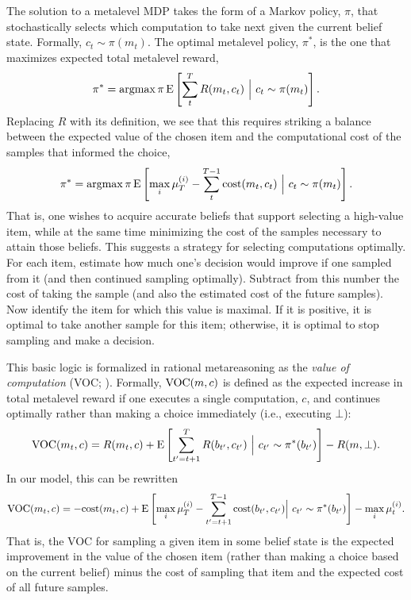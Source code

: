 The solution to a metalevel MDP takes the form of a Markov policy, $\pi$, that stochastically selects which computation to take next given the current belief state. Formally, $c_t \sim \pi(m_t)$. The optimal metalevel policy, $\pi^*$, is the one that maximizes expected total metalevel reward,
\begin{equation*}
  \pi^* = \operatorname*{argmax}{\pi} \operatorname*{E} \left[ \sum_t^T R(m_t, c_t) \ \Big\vert\ c_t \sim \pi(m_t) \right].
\end{equation*}
Replacing $R$ with its definition, we see that this requires striking a balance between the expected value of the chosen item and the computational cost of the samples that informed the choice,
\begin{equation*}
  \pi^* = \operatorname*{argmax}{\pi} \operatorname*{E} \left[
     \max_i \mu_T^{(i)} - \sum_t^{T-1} \text{cost}(m_t, c_t)
   \ \Big\vert\ c_t \sim \pi(m_t) \right].
\end{equation*}
That is, one wishes to acquire accurate beliefs that support selecting a high-value item, while at the same time minimizing the cost of the samples necessary to attain those beliefs. This suggests a strategy for selecting computations optimally. For each item, estimate how much one's decision would improve if one sampled from it (and then continued sampling optimally). Subtract from this number the cost of taking the sample (and also the estimated cost of the future samples). Now identify the item for which this value is maximal. If it is positive, it is optimal to take another sample for this item; otherwise, it is optimal to stop sampling and make a decision.

This basic logic is formalized in rational metareasoning as the \textit{value of computation} (VOC; \citealp{russell1991principles}). Formally, $\text{VOC}(m, c)$ is defined as the expected increase in total metalevel reward if one executes a single computation, $c$, and continues optimally rather than making a choice immediately (i.e., executing $\bot$):
$$
\text{VOC}(m_t, c) = R(m_t, c) + \operatorname*{E} \left[
  \sum_{t'=t+1}^T R(b_{t'}, c_{t'})\ \Big\vert\ c_{t'} \sim \pi^*(b_{t'}) 
\right] - R(m, \bot).
$$
In our model, this can be rewritten
$$
\text{VOC}(m_t, c) = -\text{cost}(m_t, c) + \operatorname*{E} \left[ 
  \max_i \mu_T^{(i)} - \sum_{t'=t+1}^{T-1} \text{cost}(b_{t'}, c_{t'})
  \Big\vert\ c_{t'} \sim \pi^*(b_{t'})
\right] -  \max_i \mu_t^{(i)}.
$$
That is, the VOC for sampling a given item in some belief state is the expected improvement in the value of the chosen item (rather than making a choice based on the current belief) minus the cost of sampling that item and the expected cost of all future samples.

